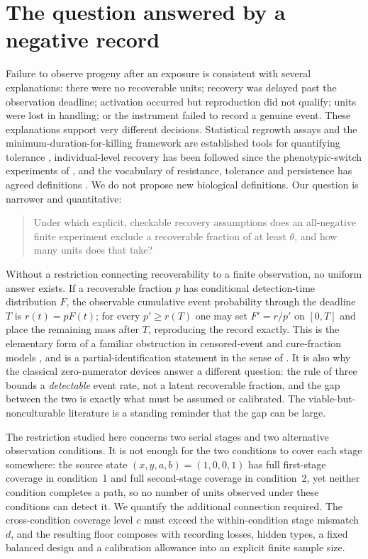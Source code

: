 \documentclass[11pt]{article}
\theoremstyle{definition}
\theoremstyle{remark}
\begin{document}
\section{The question answered by a negative record}\label{sec:intro}

Failure to observe progeny after an exposure is consistent with several
explanations: there were no recoverable units; recovery was delayed past the
observation deadline; activation occurred but reproduction did not qualify;
units were lost in handling; or the instrument failed to record a genuine event.
These explanations support very different decisions. Statistical regrowth assays
and the minimum-duration-for-killing framework are established tools for
quantifying tolerance \citep{brauner2016,brauner2017}, individual-level recovery
has been followed since the phenotypic-switch experiments of
\citet{balaban2004}, and the vocabulary of resistance, tolerance and persistence
has agreed definitions \citep{balaban2019}. We do not propose new biological
definitions. Our question is narrower and quantitative:

\begin{quote}
Under which explicit, checkable recovery assumptions does an all-negative finite
experiment exclude a recoverable fraction of at least $\theta$, and how many
units does that take?
\end{quote}

Without a restriction connecting recoverability to a finite observation, no
uniform answer exists. If a recoverable fraction $p$ has conditional
detection-time distribution $F$, the observable cumulative event probability
through the deadline $T$ is $r(t)=pF(t)$; for every $p'\ge r(T)$ one may set
$F'=r/p'$ on $[0,T]$ and place the remaining mass after $T$, reproducing the
record exactly. This is the elementary form of a familiar obstruction in
censored-event and cure-fraction models \citep{maller1992,amico2018}, and is a
partial-identification statement in the sense of \citet{manski2003}. It is also
why the classical zero-numerator devices \citep{hanley1983,clopper1934,tuyl2009}
answer a different question: the rule of three bounds a \emph{detectable} event
rate, not a latent recoverable fraction, and the gap between the two is exactly
what must be assumed or calibrated. The viable-but-nonculturable literature
\citep{oliver2010} is a standing reminder that the gap can be large.

The restriction studied here concerns two serial stages and two alternative
observation conditions. It is not enough for the two conditions to cover each
stage somewhere: the source state $(x,y,a,b)=(1,0,0,1)$ has full first-stage
coverage in condition~1 and full second-stage coverage in condition~2, yet
neither condition completes a path, so no number of units observed under these
conditions can detect it. We quantify the additional connection required. The
cross-condition coverage level $c$ must exceed the within-condition stage
mismatch $d$, and the resulting floor composes with recording losses, hidden
types, a fixed balanced design and a calibration allowance into an explicit
finite sample size.
\end{document}
